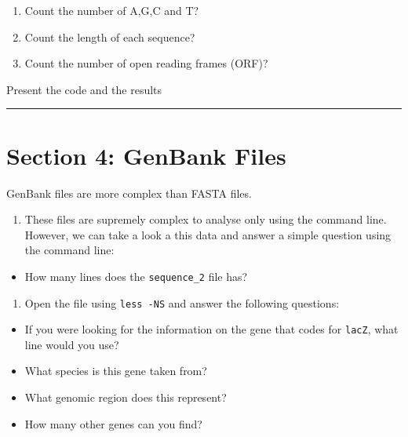 \documentclass[
]{book}
\providecommand{\tightlist}{%
  \setlength{\itemsep}{0pt}\setlength{\parskip}{0pt}}
\begin{document}
\begin{enumerate}
\def\labelenumi{\arabic{enumi}.}
\tightlist
\item
  Count the number of A,G,C and T?
\item
  Count the length of each sequence?
\item
  Count the number of open reading frames (ORF)?
\end{enumerate}

Present the code and the results

\begin{center}\rule{0.5\linewidth}{0.5pt}\end{center}

\hypertarget{section-4-genbank-files}{%
\section{Section 4: GenBank Files}\label{section-4-genbank-files}}

GenBank files are more complex than FASTA files.

\begin{enumerate}
\def\labelenumi{\arabic{enumi}.}
\tightlist
\item
  These files are supremely complex to analyse only using the command line. However, we can take a look a this data and answer a simple question using the command line:
\end{enumerate}

\begin{itemize}
\tightlist
\item
  How many lines does the \texttt{sequence\_2} file has?
\end{itemize}

\begin{enumerate}
\def\labelenumi{\arabic{enumi}.}
\setcounter{enumi}{1}
\tightlist
\item
  Open the file using \texttt{less\ -NS} and answer the following questions:
\end{enumerate}

\begin{itemize}
\tightlist
\item
  If you were looking for the information on the gene that codes for \texttt{lacZ}, what line would you use?
\item
  What species is this gene taken from?
\item
  What genomic region does this represent?
\item
  How many other genes can you find?
\end{itemize}
\end{document}
